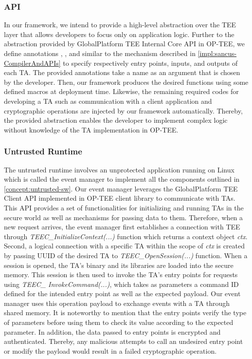 \subsubsection{API}

In our framework, we intend to provide a high-level abstraction over the TEE
layer that allows developers to focus only on application logic. Further to the
abstraction provided by GlobalPlatform TEE Internal Core API in OP-TEE, we
define annotations \smentry, \sminput{}, and \smoutput{} similar to the
mechanism described in \cref{impl:sancus-CompilerAndAPIs} to specify
respectively entry points, inputs, and outputs of each TA. The provided
annotations take a name as an argument that is chosen by the developer. Then,
our framework produces the desired functions using some defined macros at
deployment time. Likewise, the remaining required codes for developing a TA such
as communication with a client application and cryptographic operations are
injected by our framework automatically. Thereby, the provided abstraction
enables the developer to implement complex logic without knowledge of the TA
implementation in OP-TEE.

\subsubsection{Untrusted Runtime}

The untrusted runtime involves an unprotected application running on Linux which
is called the event manager to implement all the components outlined in
\cref{concept:untrusted-sw}. Our event manager leverages the GlobalPlatform TEE
Client API implemented in OP-TEE client library to communicate with TAs. This
API provides a set of functionalities for initializing and running TAs in the
secure world as well as mechanisms for passing data to them. Therefore, when a
new \loadmodule{} request arrives, the event manager first establishes a
connection with TEE through \emph{TEEC\_InitializeContext(...)} function which
returns a context object \emph{ctx}. Second, a logical connection with a
specific TA within the scope of \emph{ctx} is created by passing UUID of the
desired TA to \emph{TEEC\_OpenSession(...)} function. When a session is opened,
the TA’s binary and its libraries are loaded into the secure memory. This
session is then used to invoke the TA's entry points for \callentry{} requests
using \emph{TEEC\_ InvokeCommand(...)}, which takes as parameters a command ID
defined for the intended entry point as well as the expected payload. Our event
manager uses this operation payload to exchange events with a TA through shared
memory.  It is noteworthy to mention that the entry points verify
the type of parameters before using them to check its value according to the
expected parameter. In addition, the data passed to entry points is encrypted
and authenticated. Thereby, any malicious attempts to call an undesired entry
point or modify the payload would result in a failed cryptographic
operation. 

